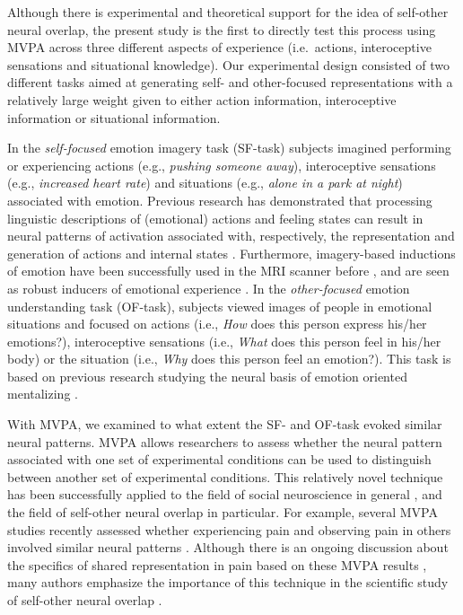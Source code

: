 \documentclass[12pt,american,a4paper,oneside,]{memoir} %
\begin{document}
Although there is experimental and theoretical support for the idea of self-other neural overlap, the present study is the first to directly test this process using MVPA across three different aspects of experience (i.e.~actions, interoceptive sensations and situational knowledge). Our experimental design consisted of two different tasks aimed at generating self- and other-focused representations with a relatively large weight given to either action information, interoceptive information or situational information.

In the \emph{self-focused} emotion imagery task (SF-task) subjects imagined performing or experiencing actions (e.g., \emph{pushing someone away}), interoceptive sensations (e.g., \emph{increased heart rate}) and situations (e.g., \emph{alone in a park at night}) associated with emotion. Previous research has demonstrated that processing linguistic descriptions of (emotional) actions and feeling states can result in neural patterns of activation associated with, respectively, the representation and generation of actions and internal states \autocite{pulvermuller2010active,oosterwijk2015concepts}. Furthermore, imagery-based inductions of emotion have been successfully used in the MRI scanner before \autocite{wilson2011grounding,oosterwijk2012states}, and are seen as robust inducers of emotional experience \autocite{lench2011discrete}. In the \emph{other-focused} emotion understanding task (OF-task), subjects viewed images of people in emotional situations and focused on actions (i.e., \emph{How} does this person express his/her emotions?), interoceptive sensations (i.e., \emph{What} does this person feel in his/her body) or the situation (i.e., \emph{Why} does this person feel an emotion?). This task is based on previous research studying the neural basis of emotion oriented mentalizing \autocite{spunt2012integrative}.

With MVPA, we examined to what extent the SF- and OF-task evoked similar neural patterns. MVPA allows researchers to assess whether the neural pattern associated with one set of experimental conditions can be used to distinguish between another set of experimental conditions. This relatively novel technique has been successfully applied to the field of social neuroscience in general \autocites[e.g.,][]{gilbert2012evaluative}{brosch2013implicit}{parkinson2014common}, and the field of self-other neural overlap in particular. For example, several MVPA studies recently assessed whether experiencing pain and observing pain in others involved similar neural patterns \autocite{corradi2016cross,krishnan2016somatic}. Although there is an ongoing discussion about the specifics of shared representation in pain based on these MVPA results \autocite[see for an overview][]{zaki2016anatomy}, many authors emphasize the importance of this technique in the scientific study of self-other neural overlap \autocites[e.g.,][]{corradi2016cross}{krishnan2016somatic}.
\end{document}
